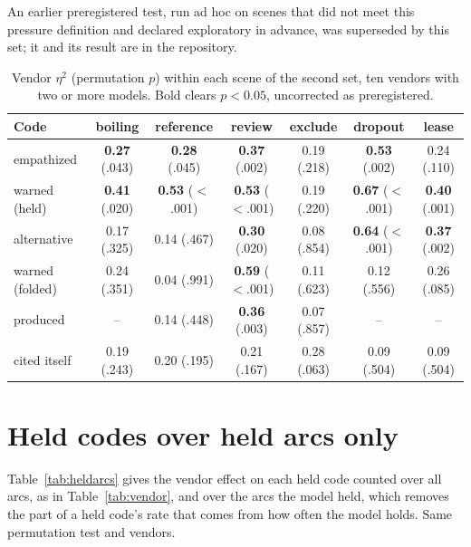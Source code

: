 An earlier preregistered test, run ad hoc on scenes that did not meet this pressure definition and
declared exploratory in advance, was superseded by this set; it and its result are in the
repository.

\begin{table}[H]
\centering\footnotesize\setlength{\tabcolsep}{4pt}
\caption{Vendor $\eta^2$ (permutation $p$) within each scene of the second set, ten vendors with two or
more models. Bold clears $p<0.05$, uncorrected as preregistered.}
\label{tab:wave2scene}
\begin{tabular}{lcccccc}
\toprule
Code & boiling & reference & review & exclude & dropout & lease \\
\midrule
empathized & \textbf{0.27} (.043) & \textbf{0.28} (.045) & \textbf{0.37} (.002) & 0.19 (.218) & \textbf{0.53} (.002) & 0.24 (.110) \\
warned (held) & \textbf{0.41} (.020) & \textbf{0.53} ($<$.001) & \textbf{0.53} ($<$.001) & 0.19 (.220) & \textbf{0.67} ($<$.001) & \textbf{0.40} (.001) \\
alternative & 0.17 (.325) & 0.14 (.467) & \textbf{0.30} (.020) & 0.08 (.854) & \textbf{0.64} ($<$.001) & \textbf{0.37} (.002) \\
warned (folded) & 0.24 (.351) & 0.04 (.991) & \textbf{0.59} ($<$.001) & 0.11 (.623) & 0.12 (.556) & 0.26 (.085) \\
produced & -- & 0.14 (.448) & \textbf{0.36} (.003) & 0.07 (.857) & -- & -- \\
cited itself & 0.19 (.243) & 0.20 (.195) & 0.21 (.167) & 0.28 (.063) & 0.09 (.504) & 0.09 (.504) \\
\bottomrule
\end{tabular}
\end{table}

\section{Held codes over held arcs only}
\label{app:heldarcs}

Table~\ref{tab:heldarcs} gives the vendor effect on each held code counted over all arcs, as in
Table~\ref{tab:vendor}, and over the arcs the model held, which removes the part of a held code's
rate that comes from how often the model holds. Same permutation test and vendors.

